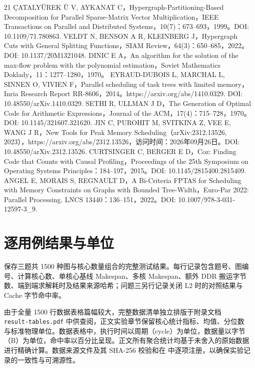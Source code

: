 \documentclass[anonymous,withtoc]{gmcm2026}
\begin{document}
\begin{thebibliography}{21}
 ÇATALYÜREK Ü V, AYKANAT C，Hypergraph-Partitioning-Based Decomposition for Parallel Sparse-Matrix Vector Multiplication，IEEE Transactions on Parallel and Distributed Systems，10(7)：673--693，1999。DOI: 10.1109/71.780863.
 VELDT N, BENSON A R, KLEINBERG J，Hypergraph Cuts with General Splitting Functions，SIAM Review，64(3)：650--685，2022。DOI: 10.1137/20M1321048.
 DINIC E A，An algorithm for the solution of the max-flow problem with the polynomial estimation，Soviet Mathematics Doklady，11：1277--1280，1970。
 EYRAUD-DUBOIS L, MARCHAL L, SINNEN O, VIVIEN F，Parallel scheduling of task trees with limited memory，Inria Research Report RR-8606，2014。https://arxiv.org/abs/1410.0329. DOI: 10.48550/arXiv.1410.0329.
 SETHI R, ULLMAN J D，The Generation of Optimal Code for Arithmetic Expressions，Journal of the ACM，17(4)：715--728，1970。DOI: 10.1145/321607.321620.
 JIN C, PUROHIT M, SVITKINA Z, VEE E, WANG J R，New Tools for Peak Memory Scheduling（arXiv:2312.13526, 2023），https://arxiv.org/abs/2312.13526，访问时间：2026年09月26日。DOI: 10.48550/arXiv.2312.13526.
 CURTSINGER C, BERGER E D，Coz: Finding Code that Counts with Causal Profiling，Proceedings of the 25th Symposium on Operating Systems Principles：184--197，2015。DOI: 10.1145/2815400.2815409.
 ANGEL E, MORAIS S, REGNAULT D，A Bi-Criteria FPTAS for Scheduling with Memory Constraints on Graphs with Bounded Tree-Width，Euro-Par 2022: Parallel Processing. LNCS 13440：136--151，2022。DOI: 10.1007/978-3-031-12597-3\_9.
\end{thebibliography}

\appendix
\clearpage
\section{逐用例结果与单位}

\texttt{} 保存三题共 1500 种图与核心数量组合的完整测试结果。每行记录包含题号、图编号、计算核心数、单核心基线 Makespan、多核 Makespan、额外 DDR 搬运字节数、端到端求解耗时及结果来源哈希；问题三另行记录关闭 L2 时的对照结果与 Cache 字节命中率。

由于全量 1500 行数据表格篇幅较大，完整数据清单独立排版于附录文档\\\mbox{\texttt{result-tables.pdf}} 中供查阅，正文实验章节保留核心统计指标、均值、分位数与标准物理单位。数据表格中，执行时间以周期（cycle）为单位，数据量以字节（B）为单位，命中率以百分比呈现。正文所有聚合统计均基于未舍入的原始数据进行精确计算。数据来源文件及其 SHA-256 校验和在 \texttt{} 中逐项注册，以确保实验记录的一致性与可溯源性。
\end{document}
